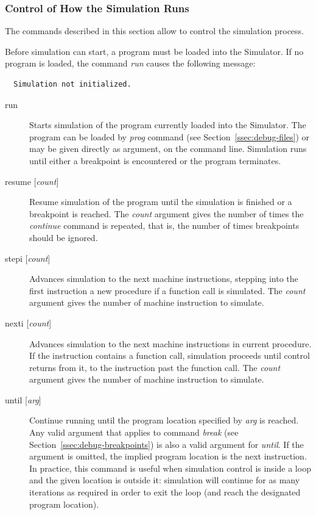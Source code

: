 \documentclass[a4paper,twoside]{tceusermanual}
\begin{document}
\subsubsection{Control of How the Simulation Runs}
\label{ssec:debug-running}

The commands described in this section allow to control the simulation process.

Before simulation can start, a program must be loaded into the Simulator.
If no program is loaded, the command \emph{run} causes the following
message:
\begin{verbatim}
  Simulation not initialized.
\end{verbatim}

\begin{description}
\item[run] %
  Starts simulation of the program currently loaded into the Simulator.  The
  program can be loaded by \emph{prog} command (see
  Section~\ref{ssec:debug-files}) or may be given directly as argument, on
  the command line.  Simulation runs until either a breakpoint is
  encountered or the program terminates.

\item[resume {[\emph{count}]}] %
  Resume simulation of the program until the simulation is finished or a
  breakpoint is reached.  The \emph{count} argument gives the
  number of times the \emph{continue} command is repeated, that is, the
  number of times breakpoints should be ignored.

\item[stepi {[\emph{count}]}] %
  Advances simulation to the next machine instructions, stepping into the
  first instruction a new procedure if a function call is simulated.  The
  \emph{count} argument gives the number of machine instruction to simulate.

\item[nexti {[\emph{count}]}] %
  Advances simulation to the next machine instructions in current procedure.
  If the instruction contains a function call, simulation proceeds until
  control returns from it, to the instruction past the function call.  The
  \emph{count} argument gives the number of machine instruction to simulate.

\item[until {[\emph{arg}]}] %
  Continue running until the program location specified by \emph{arg} is
  reached.  Any valid argument that applies to command \emph{break} (see
  Section~\ref{ssec:debug-breakpoints}) is also a valid argument for
  \emph{until}.  If the argument is omitted, the implied program location
  is the next instruction.  In practice, this command is useful when
  simulation control is inside a loop and the given location is outside it:
  simulation will continue for as many iterations as required in order to
  exit the loop (and reach the designated program location).


\end{description}
\end{document}
